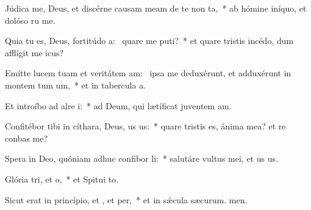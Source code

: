 \item Júdica me, Deus, et discérne causam meam de te non ta,~* ab hómine iníquo, et dolóso ru me.
\item Quia tu es, Deus, fortitúdo a:~\pscross{} quare me puti?~* et quare tristis incédo, dum afflígit me icus?
\item Emítte lucem tuam et veritátem am:~\pscross{} ipsa me deduxérunt, et adduxérunt in montem tum um,~* et in tabercula a.
\item Et introíbo ad alre i:~* ad Deum, qui lætíficat juventem am.
\item Confitébor tibi in cíthara, Deus, us us:~* quare tristis es, ánima mea? et re conbas me?
\item Spera in Deo, quóniam adhuc confibor li:~* salutáre vultus mei, et us us.
\item Glória tri, et o,~* et Spitui to.
\item Sicut erat in princípio, et , et per,~* et in sǽcula sæcurum. men.
